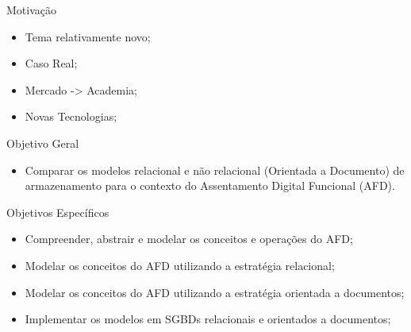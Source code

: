 

\begin{frame}{Motivação}
    \begin{itemize}
    \item Tema relativamente novo;
    \item Caso Real;
    \item Mercado -> Academia;
    \item Novas Tecnologias;
    \end{itemize}
\end{frame}


\begin{frame}{Objetivo Geral}
    \begin{itemize}
    \item Comparar os modelos relacional e não relacional (Orientada a Documento) de armazenamento  para o contexto do Assentamento Digital Funcional (AFD).
    \end{itemize}
\end{frame}


\begin{frame}{Objetivos Específicos}
    \begin{itemize}
    \item Compreender, abstrair e modelar os conceitos e operações do AFD;
    \item Modelar os conceitos do AFD utilizando a estratégia relacional;
    \item Modelar os conceitos do AFD utilizando a estratégia orientada a documentos;
    \item Implementar os modelos em SGBDs relacionais e orientados a documentos;
    \end{itemize}
\end{frame}

